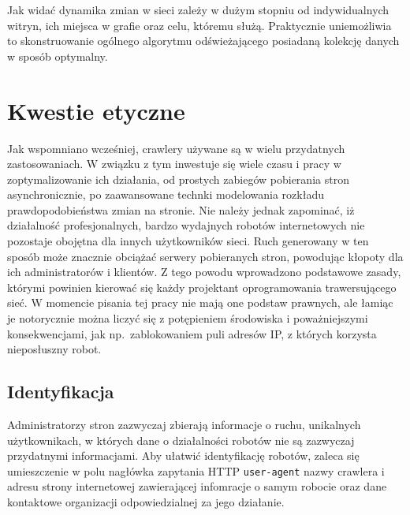 Jak widać dynamika zmian w sieci zależy w dużym stopniu od indywidualnych witryn, ich miejsca w grafie oraz
celu, któremu służą. Praktycznie uniemożliwia to skonstruowanie ogólnego algorytmu odświeżającego posiadaną
kolekcję danych w sposób optymalny.


\section{Kwestie etyczne}
\label{sec:etyczne}
Jak wspomniano wcześniej, crawlery używane są w wielu przydatnych zastosowaniach. W związku z tym inwestuje się wiele czasu i pracy w zoptymalizowanie
ich działania, od prostych zabiegów pobierania stron asynchronicznie, po zaawansowane technki modelowania rozkładu prawdopodobieństwa zmian na stronie.
Nie należy jednak zapominać, iż działalność profesjonalnych, bardzo wydajnych robotów internetowych nie pozostaje obojętna dla innych użytkowników 
sieci. Ruch generowany w ten sposób może znacznie obciążać serwery pobieranych stron, powodując kłopoty dla ich administratorów i klientów.
Z tego powodu wprowadzono podstawowe zasady, którymi powinien kierować się każdy projektant oprogramowania trawersującego sieć. W momencie pisania
tej pracy nie mają one podstaw prawnych, ale łamiąc je notorycznie można liczyć się z potępieniem środowiska i poważniejszymi konsekwencjami, jak np.~zablokowaniem
puli adresów IP, z których korzysta nieposłuszny robot.


\subsection{Identyfikacja}
\label{subsec:identyfikacja}

Administratorzy stron zazwyczaj zbierają informacje o ruchu, unikalnych użytkownikach, w których dane o działalności robotów nie są zazwyczaj przydatnymi
informacjami. Aby ułatwić identyfikację robotów, zaleca się umieszczenie w polu nagłówka zapytania HTTP \texttt{user-agent} nazwy crawlera i adresu
strony internetowej zawierającej infomracje o samym robocie oraz dane kontaktowe organizacji odpowiedzialnej za jego działanie.


